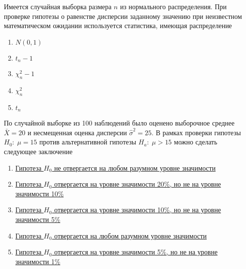 \documentclass[t]{beamer}
\begin{document}
 \begin{frame} \label{11} 
\begin{block}{11} 

Имеется случайная выборка размера $n$ из нормального распределения. При проверке гипотезы о равенстве дисперсии заданному значению при неизвестном математическом ожидании используется статистика, имеющая распределение
 


 \end{block} 
\begin{enumerate} 
\item[] \hyperlink{11-No}{\beamergotobutton{} $N(0,1)$}
\item[] \hyperlink{11-No}{\beamergotobutton{} $t_n-1$}
\item[] \hyperlink{11-Yes}{\beamergotobutton{} $\chi^2_n-1$}
\item[] \hyperlink{11-No}{\beamergotobutton{} $\chi^2_n$}
\item[] \hyperlink{11-No}{\beamergotobutton{} $t_n$}
\end{enumerate} 
\end{frame} 


 \begin{frame} \label{12} 
\begin{block}{12} 

По случайной выборке из 100 наблюдений было оценено выборочное среднее $\bar{X}=20$  и несмещенная оценка дисперсии  $\hat{\sigma}^2=25$. В рамках проверки гипотезы $H_0: \; \mu=15$  против альтернативной гипотезы $H_a: \; \mu>15$  можно сделать следующее заключение
 


 \end{block} 
\begin{enumerate} 
\item[] \hyperlink{12-No}{\beamergotobutton{} Гипотеза $H_0$  не отвергается на любом разумном уровне значимости}
\item[] \hyperlink{12-No}{\beamergotobutton{} Гипотеза  $H_0$ отвергается на уровне значимости 20\%, но не  на уровне значимости 10\%}
\item[] \hyperlink{12-No}{\beamergotobutton{} Гипотеза  $H_0$ отвергается на уровне значимости 10\%, но не на уровне значимости 5\%}
\item[] \hyperlink{12-Yes}{\beamergotobutton{} Гипотеза $H_0$  отвергается на любом разумном уровне значимости}
\item[] \hyperlink{12-No}{\beamergotobutton{} Гипотеза $H_0$  отвергается на уровне значимости 5\%, но не  на уровне значимости 1\%}
\end{enumerate} 
\end{frame} 
\end{document}
